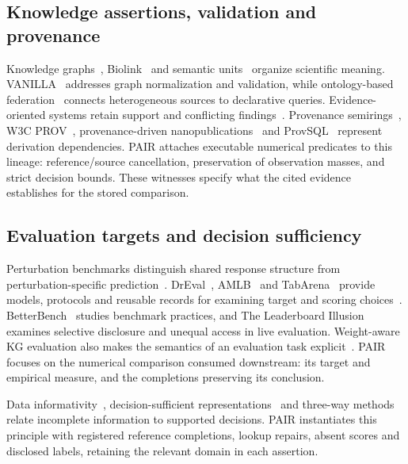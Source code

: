 \documentclass[preprint,12pt,number,sort&compress]{elsarticle}
\begin{document}
\subsection{Knowledge assertions, validation and provenance}
Knowledge graphs~\cite{hogan2021knowledge}, Biolink~\cite{unni2022biolink} and semantic units~\cite{vogt2024semanticunits,vogt2026framework} organize scientific meaning. VANILLA~\cite{purohit2025vanilla} addresses graph normalization and validation, while ontology-based federation~\cite{gu2025obdf} connects heterogeneous sources to declarative queries. Evidence-oriented systems retain support and conflicting findings~\cite{shamshiri2026security,mohamed2026orchestra}. Provenance semirings~\cite{green2007provenance}, W3C PROV~\cite{w3c2013prov}, provenance-driven nanopublications~\cite{menotti2025provenance} and ProvSQL~\cite{sen2026provsql} represent derivation dependencies. PAIR attaches executable numerical predicates to this lineage: reference/source cancellation, preservation of observation masses, and strict decision bounds. These witnesses specify what the cited evidence establishes for the stored comparison.

\subsection{Evaluation targets and decision sufficiency}
Perturbation benchmarks distinguish shared response structure from perturbation-specific prediction~\cite{ahlmann2025baselines,wei2026benchmark,vinas2026systema,wu2025perturbench,miller2026calibrated}. DrEval~\cite{bernett2026dreval}, AMLB~\cite{gijsbers2024amlb} and TabArena~\cite{erickson2025tabarena} provide models, protocols and reusable records for examining target and scoring choices~\cite{shirdel2026metrics}. BetterBench~\cite{reuel2024betterbench} studies benchmark practices, and The Leaderboard Illusion~\cite{singh2025leaderboard} examines selective disclosure and unequal access in live evaluation. Weight-aware KG evaluation also makes the semantics of an evaluation task explicit~\cite{kong2025weightaware}. PAIR focuses on the numerical comparison consumed downstream: its target and empirical measure, and the completions preserving its conclusion.

Data informativity~\cite{vanwaarde2020informativity}, decision-sufficient representations~\cite{bennouna2025decision,ye2026decisionsufficient} and three-way methods~\cite{li2026clustering,li2026incomplete,zhang2026adaptive} relate incomplete information to supported decisions. PAIR instantiates this principle with registered reference completions, lookup repairs, absent scores and disclosed labels, retaining the relevant domain in each assertion.
\end{document}
